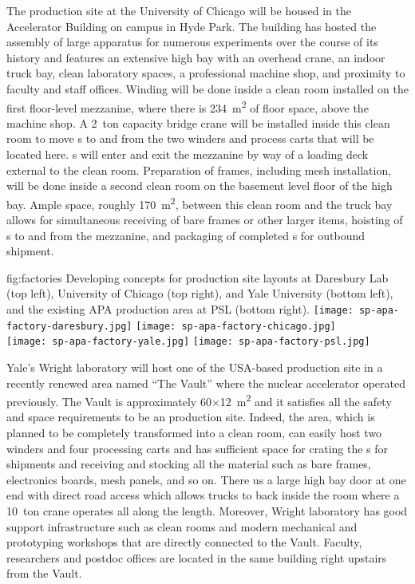 The  production site at the University of Chicago will be housed in the Accelerator Building on campus in Hyde Park.  The building has hosted the assembly of large apparatus for numerous experiments over the course of its history and features an extensive high bay with an overhead crane, an indoor truck bay, clean laboratory spaces, a professional machine shop, and proximity to faculty and staff offices.  Winding will be done inside a clean room installed on the first floor-level mezzanine, where there is \SI{234}{m^2} of floor space, above the machine shop.  A \SI{2}{ton} capacity bridge crane will be installed inside this clean room to move s to and from the two winders and process carts that will be located here.  s will enter and exit the mezzanine by way of a loading deck external to the clean room.  Preparation of  frames, including mesh installation, will be done inside a second clean room on the basement level floor of the high bay.  Ample space, roughly \SI{170}{m^2}, between this clean room and the truck bay allows for simultaneous receiving of bare frames or other larger items, hoisting of s to and from the mezzanine, and packaging of completed s for outbound shipment.

\begin{dunefigure}{fig:factories}
{Developing concepts for production site layouts at Daresbury Lab (top left), University of Chicago (top right), and Yale University (bottom left), and the existing APA production area at PSL (bottom right).}
\texttt{[image: sp-apa-factory-daresbury.jpg]} 
\texttt{[image: sp-apa-factory-chicago.jpg]} \\
\vspace{1mm}
\texttt{[image: sp-apa-factory-yale.jpg]}
\texttt{[image: sp-apa-factory-psl.jpg]} 
\end{dunefigure}

Yale's Wright laboratory will host one of the USA-based  production site in a recently renewed area named ``The Vault'' %
where the nuclear accelerator operated previously.  The Vault is approximately 60$\times$\SI{12}{m^2} and it satisfies all the safety and space requirements to be an  production site. 
Indeed, the area, which is planned to be completely transformed into a clean room, can easily host two winders and four processing carts and has sufficient space for crating the s for shipments and receiving and stocking all the material such as bare frames, electronics boards, mesh panels, and so on. 
There us a large high bay door at one end with direct road access which allows trucks to back inside the room where a \SI{10}{ton} crane operates all along the length.  Moreover, Wright laboratory has good support infrastructure such as clean rooms and modern mechanical and prototyping workshops that are directly connected to the Vault. Faculty, researchers and postdoc offices are located in the same building right upstairs from the Vault.

